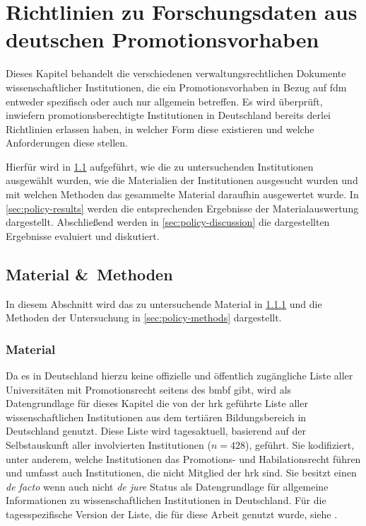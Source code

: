 \chapter{Richtlinien zu Forschungsdaten aus deutschen Promotionsvorhaben}\label{ch:richtlinien}
Dieses Kapitel behandelt die verschiedenen verwaltungsrechtlichen Dokumente wissenschaftlicher Institutionen, die ein Promotionsvorhaben in Bezug auf \gls{fdm} entweder spezifisch oder auch nur allgemein betreffen.
Es wird überprüft, inwiefern promotionsberechtigte Institutionen in Deutschland bereits derlei Richtlinien erlassen haben, in welcher Form diese existieren und welche Anforderungen diese stellen.

Hierfür wird in \cref{sec:policy-material-methods} aufgeführt, wie die zu untersuchenden Institutionen ausgewählt wurden, wie die Materialien der Institutionen ausgesucht wurden und mit welchen Methoden das gesammelte Material daraufhin ausgewertet wurde.
In \cref{sec:policy-results} werden die entsprechenden Ergebnisse der Materialauswertung dargestellt.
Abschließend werden in \cref{sec:policy-discussion} die dargestellten Ergebnisse evaluiert und diskutiert.

\section{Material \&\ Methoden}\label{sec:policy-material-methods}
In diesem Abschnitt wird das zu untersuchende Material in \cref{sec:policy-material} und die Methoden der Untersuchung in \cref{sec:policy-methods} dargestellt.

\subsection{Material}\label{sec:policy-material}
Da es in Deutschland hierzu keine offizielle und öffentlich zugängliche Liste aller Universitäten mit Promotionsrecht seitens des \gls{bmbf} gibt, wird als Datengrundlage für dieses Kapitel die von der \gls{hrk} geführte Liste aller wissenschaftlichen Institutionen aus dem tertiären Bildungsbereich in Deutschland \autocite{Hochschulkompass-Liste} genutzt.
Diese Liste wird tagesaktuell, basierend auf der Selbstauskunft aller involvierten Institutionen ($n=428$), geführt.
Sie kodifiziert, unter anderem, welche Institutionen das Promotions- und Habilationsrecht führen und umfasst auch Institutionen, die nicht Mitglied der \gls{hrk} sind.
Sie besitzt einen \textit{de facto} wenn auch nicht \textit{de jure} Status als Datengrundlage für allgemeine Informationen zu wissenschaftlichen Institutionen in Deutschland.
Für die tagesspezifische Version der Liste, die für diese Arbeit genutzt wurde, siehe \autocite{my-dataset}.

